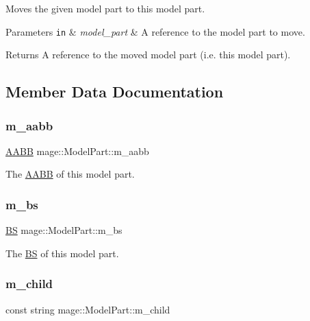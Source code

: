 Moves the given model part to this model part.


\begin{DoxyParams}[1]{Parameters}
\mbox{\tt in}  & {\em model\+\_\+part} & A reference to the model part to move. \\
\hline
\end{DoxyParams}
\begin{DoxyReturn}{Returns}
A reference to the moved model part (i.\+e. this model part). 
\end{DoxyReturn}


\subsection{Member Data Documentation}
\hypertarget{structmage_1_1_model_part_ab5b4cb74ac7d725896825b0f7ce8472a}{}\label{structmage_1_1_model_part_ab5b4cb74ac7d725896825b0f7ce8472a} 
\subsubsection{\texorpdfstring{m\+\_\+aabb}{m\_aabb}}
{\footnotesize\ttfamily \hyperlink{structmage_1_1_a_a_b_b}{A\+A\+BB} mage\+::\+Model\+Part\+::m\+\_\+aabb}

The \hyperlink{structmage_1_1_a_a_b_b}{A\+A\+BB} of this model part. \hypertarget{structmage_1_1_model_part_a551f6c340fa5547364e6cde9720ad856}{}\label{structmage_1_1_model_part_a551f6c340fa5547364e6cde9720ad856} 
\subsubsection{\texorpdfstring{m\+\_\+bs}{m\_bs}}
{\footnotesize\ttfamily \hyperlink{structmage_1_1_b_s}{BS} mage\+::\+Model\+Part\+::m\+\_\+bs}

The \hyperlink{structmage_1_1_b_s}{BS} of this model part. \hypertarget{structmage_1_1_model_part_ae22f193f0af75fe32f051126163f3fc2}{}\label{structmage_1_1_model_part_ae22f193f0af75fe32f051126163f3fc2} 
\subsubsection{\texorpdfstring{m\+\_\+child}{m\_child}}
{\footnotesize\ttfamily const string mage\+::\+Model\+Part\+::m\+\_\+child}

